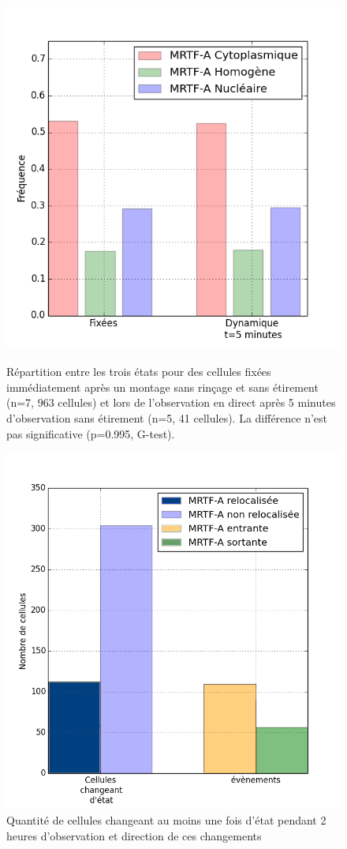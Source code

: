 \documentclass                                                                                                                                                                                                                                                                                                                                       {report}
\begin{document}
\begin{figure}[p]
\includegraphics[scale=0.5]{Figures/Reference.png} 
\caption{Répartition entre les trois états pour des cellules fixées immédiatement après un montage sans rinçage et sans étirement (n=7, 963 cellules) et lors de l'observation en direct après 5 minutes d'observation sans étirement (n=5, 41 cellules). La différence n'est pas significative (p=0.995, G-test).
\label{Référence}}
\includegraphics[scale=0.4]{Figures/Reference_transloc.png} 
\caption{Quantité de cellules changeant au moins une fois d'état pendant 2 heures d'observation et direction de ces changements \label{Ref_transloc}}
\end{figure}
\end{document}
